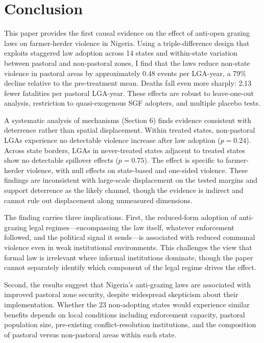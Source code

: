 \documentclass[12pt]{article}
\begin{document}
\section{Conclusion}

This paper provides the first causal evidence on the effect of anti-open grazing laws on farmer-herder violence in Nigeria. Using a triple-difference design that exploits staggered law adoption across 14 states and within-state variation between pastoral and non-pastoral zones, I find that the laws reduce non-state violence in pastoral areas by approximately 0.48 events per LGA-year, a 79\% decline relative to the pre-treatment mean. Deaths fall even more sharply: 2.13 fewer fatalities per pastoral LGA-year. These effects are robust to leave-one-out analysis, restriction to quasi-exogenous SGF adopters, and multiple placebo tests.

A systematic analysis of mechanisms (Section 6) finds evidence consistent with deterrence rather than spatial displacement. Within treated states, non-pastoral LGAs experience no detectable violence increase after law adoption ($p = 0.24$). Across state borders, LGAs in never-treated states adjacent to treated states show no detectable spillover effects ($p = 0.75$). The effect is specific to farmer-herder violence, with null effects on state-based and one-sided violence. These findings are inconsistent with large-scale displacement on the tested margins and support deterrence as the likely channel, though the evidence is indirect and cannot rule out displacement along unmeasured dimensions.

The finding carries three implications. First, the reduced-form adoption of anti-grazing legal regimes---encompassing the law itself, whatever enforcement followed, and the political signal it sends---is associated with reduced communal violence even in weak institutional environments. This challenges the view that formal law is irrelevant where informal institutions dominate, though the paper cannot separately identify which component of the legal regime drives the effect.

Second, the results suggest that Nigeria's anti-grazing laws are associated with improved pastoral zone security, despite widespread skepticism about their implementation. Whether the 23 non-adopting states would experience similar benefits depends on local conditions including enforcement capacity, pastoral population size, pre-existing conflict-resolution institutions, and the composition of pastoral versus non-pastoral areas within each state.
\end{document}
